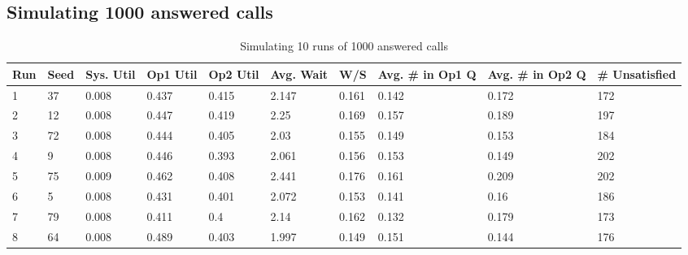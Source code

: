 \documentclass{article}
\begin{document}
\subsection{Simulating 1000 answered calls}
\begin{table}[H]
    \tiny
    \centering
    \caption{Simulating 10 runs of 1000 answered calls}
    \begin{tabular}{@{}llllllllll@{}}
        \toprule
        \textbf{Run} & \textbf{Seed} & \textbf{Sys. Util} & \textbf{Op1 Util} & \textbf{Op2 Util} & \textbf{Avg. Wait} & \textbf{W/S} & \textbf{Avg. \# in Op1 Q} & \textbf{Avg. \# in Op2 Q} & \textbf{\# Unsatisfied} \\ \midrule
        1            & 37            & 0.008              & 0.437             & 0.415             & 2.147              & 0.161        & 0.142                     & 0.172                     & 172                     \\
        2            & 12            & 0.008              & 0.447             & 0.419             & 2.25               & 0.169        & 0.157                     & 0.189                     & 197                     \\
        3            & 72            & 0.008              & 0.444             & 0.405             & 2.03               & 0.155        & 0.149                     & 0.153                     & 184                     \\
        4            & 9             & 0.008              & 0.446             & 0.393             & 2.061              & 0.156        & 0.153                     & 0.149                     & 202                     \\
        5            & 75            & 0.009              & 0.462             & 0.408             & 2.441              & 0.176        & 0.161                     & 0.209                     & 202                     \\
        6            & 5             & 0.008              & 0.431             & 0.401             & 2.072              & 0.153        & 0.141                     & 0.16                      & 186                     \\
        7            & 79            & 0.008              & 0.411             & 0.4               & 2.14               & 0.162        & 0.132                     & 0.179                     & 173                     \\
        8            & 64            & 0.008              & 0.489             & 0.403             & 1.997              & 0.149        & 0.151                     & 0.144                     & 176                     \\

\end{tabular}
\end{table}
\end{document}
